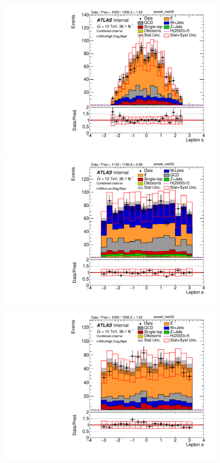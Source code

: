 \begin{figure}[!h]
\begin{center}
\includegraphics[scale=0.33]{./figures/boosted/PlotByMbbRegions/DataMC_2tag_0bjet_mbbcrHigh_lepton_presel_met50_LepEta}                                                                             
\includegraphics[scale=0.33]{./figures/boosted/PlotByMbbRegions/DataMC_2tag_0bjet_mbbcrLow_lepton_presel_met50_LepPhi}                                                                              
\includegraphics[scale=0.33]{./figures/boosted/PlotByMbbRegions/DataMC_2tag_0bjet_mbbcrHigh_lepton_presel_met50_LepPhi}                                                                             

\end{center}
\end{figure}
